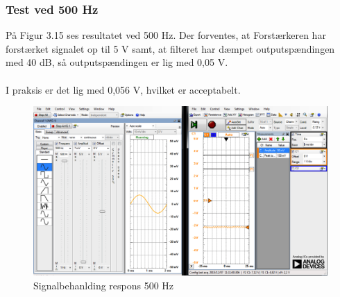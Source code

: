 \subsubsection{Test ved 500 Hz}
På Figur 3.15 ses resultatet ved 500 Hz. Der forventes, at Forstærkeren har forstærket signalet op til 5 V samt, at filteret har dæmpet outputspændingen med 40 dB, så outputspændingen er lig med 0,05 V.    
\\ \\
I praksis er det lig med 0,056 V, hvilket er acceptabelt. 

\begin{figure}[H]
	\centering
	\includegraphics[width=1\textwidth]{Figurer/Snip20151207_45}
	\caption{Signalbehanlding respons 500 Hz}
	\label{fig:Signalbehanlding}
\end{figure}




